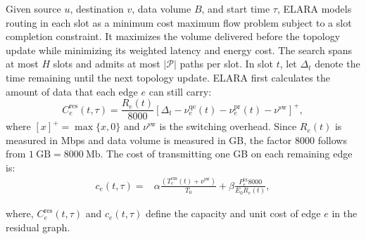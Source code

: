 \documentclass[10pt, conference, letterpaper]{IEEEtran}
\begin{document}

Given source $u$, destination $v$, data volume $B$, and start time $\tau$, ELARA models routing in each slot as a minimum cost maximum flow problem subject to a slot completion constraint. It maximizes the volume delivered before the topology update while minimizing its weighted latency and energy cost. The search spans at most $H$ slots and admits at most $|\mathcal P|$ paths per slot.
In slot $t$, let $\Delta_t$ denote the time remaining until the next topology update. ELARA first calculates the amount of data that each edge $e$ can still carry:
\begin{equation}
C_e^{\text{res}}(t,\tau)=
\frac{R_e(t)}{8000}
\left[\Delta_t-\nu^{\text{qe}}_e(t)-\nu^{\text{pr}}_e(t)-\nu^{\text{sw}}\right]^+,
\label{eq:new_residual_capacity}
\end{equation}
where $[x]^+=\max\{x,0\}$ and $\nu^{\text{sw}}$ is the switching overhead. Since $R_e(t)$ is measured in Mbps and data volume is measured in GB, the factor $8000$ follows from $1~\mathrm{GB}=8000~\mathrm{Mb}$. 
The cost of transmitting one GB on each remaining edge is:
\begin{align}
c_e(t,\tau)=
&\alpha \frac{\left( T^{\text{cm}}_e(t)+\nu^{\text{sw}}\right) }{T_0}
+\beta\frac{ P_e^{\text{tx}}8000}{E_0R_e(t)},
\label{eq:new_routing_edge_cost}
\end{align}

where, $C_e^{\text{res}}(t,\tau)$ and $c_e(t,\tau)$ define the capacity and unit cost of edge $e$ in the residual graph.
\end{document}
